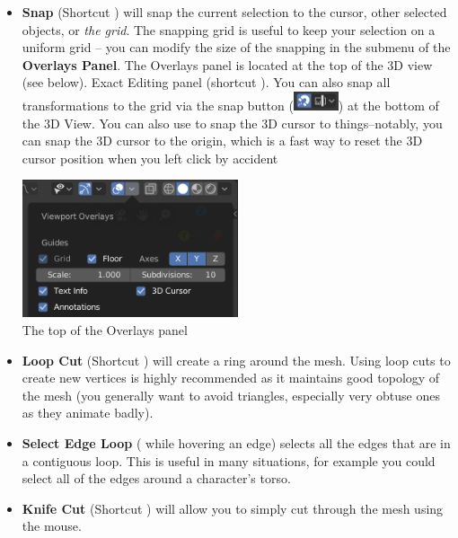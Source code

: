 \documentclass[11pt]{article}
\begin{document}
\begin{itemize}
    \item \textbf{Snap} (Shortcut ) will snap the current selection to the cursor,
    other selected objects, or \textit{the grid}.  The snapping grid is useful to keep your selection
    on a uniform grid -- you can modify the size of the snapping in the  submenu of
    the {\bf Overlays Panel}.  The Overlays panel is located at the top of the 3D view (see below).
    Exact Editing panel (shortcut ).  You can also snap all transformations to the grid via the
    snap button (\includegraphics[height=1.5em]{snap-settings}) at the bottom of the 3D View.
    You can also use  to snap the 3D cursor to things--notably, you can snap the 3D
    cursor to the origin, which is a fast way to reset the 3D cursor position when you left click
    by accident \faMehO
    \begin{center}
        \begin{samepage}
        \includegraphics[width=0.5\textwidth]{overlays}\\
        The top of the Overlays panel
        \end{samepage}
    \end{center}
    \item \textbf{Loop Cut} (Shortcut ) will create a ring around the mesh.  Using
    loop cuts to create new vertices is highly recommended as it maintains good topology of the mesh
    (you generally want to avoid triangles, especially very obtuse ones as they animate badly).
    \item \textbf{Select Edge Loop} ( while hovering an edge) selects 
    all the edges that are in a contiguous loop.  This is useful in many situations, for example you
    could select all of the edges around a character's torso.
    \item \textbf{Knife Cut} (Shortcut ) will allow you to simply cut through the mesh using
    the mouse.

\end{itemize}
\end{document}
